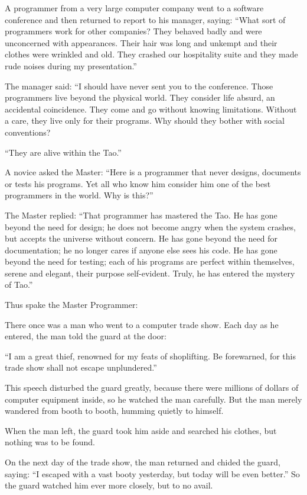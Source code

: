 A programmer from a very large computer company went to a software conference and then returned to report to his manager, saying: ``What sort of programmers work for other companies? They behaved badly and were unconcerned with appearances. Their hair was long and unkempt and their clothes were wrinkled and old. They crashed our hospitality suite and they made rude noises during my presentation.''

The manager said: ``I should have never sent you to the conference. Those programmers live beyond the physical world. They consider life absurd, an accidental coincidence. They come and go without knowing limitations. Without a care, they live only for their programs. Why should they bother with social conventions?

``They are alive within the Tao.''

A novice asked the Master: ``Here is a programmer that never designs, documents or tests his programs. Yet all who know him consider him one of the best programmers in the world. Why is this?''

The Master replied: ``That programmer has mastered the Tao. He has gone beyond the need for design; he does not become angry when the system crashes, but accepts the universe without concern. He has gone beyond the need for documentation; he no longer cares if anyone else sees his code. He has gone beyond the need for testing; each of his programs are perfect within themselves, serene and elegant, their purpose self-evident. Truly, he has entered the mystery of Tao.''

Thus spake the Master Programmer:

There once was a man who went to a computer trade show. Each day as he entered, the man told the guard at the door:

``I am a great thief, renowned for my feats of shoplifting. Be forewarned, for this trade show shall not escape unplundered.''

This speech disturbed the guard greatly, because there were millions of dollars of computer equipment inside, so he watched the man carefully. But the man merely wandered from booth to booth, humming quietly to himself.

When the man left, the guard took him aside and searched his clothes, but nothing was to be found.

On the next day of the trade show, the man returned and chided the guard, saying: ``I escaped with a vast booty yesterday, but today will be even better.'' So the guard watched him ever more closely, but to no avail.

